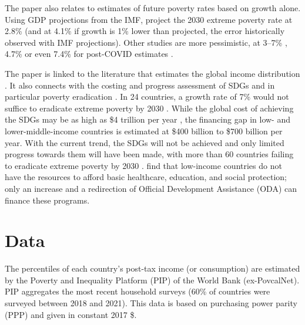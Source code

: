 \documentclass[12pt,english]{article}
\begin{document}
The paper also relates to estimates of future poverty rates based on growth alone. Using GDP projections from the IMF, \cite{karver_mdgs_2012} project the 2030 extreme poverty rate at 2.8\% (and at 4.1\% if growth is 1\% lower than projected, the error historically observed with IMF projections). Other studies are more pessimistic, at 3--7\% \citep{chandy_final_2013,bicaba_can_2017}, 4.7\% \citep{manuel_financing_2018} or even 7.4\% for post-COVID estimates \citep{lakner_how_2022}. 

The paper is linked to the literature that estimates the global income distribution \citep{pinkovskiy_parametric_2009,anand_chapter_2015,lahoti_global_2016,lakner_global_2016,gradin_trends_2021,jorda_global_2019,alvaredo_methods_2021,milanovic_three_2024}. 
It also connects with the costing and progress assessment of SDGs and in particular poverty eradication \citep{schmidt-traub_investment_2015,rozenberg_beyond_2019,sdsn_sdg_2019,manuel_financing_2020,vorisek_understanding_2020,unctad_estimating_2021,un_sustainable_2022}. In 24 countries, a growth rate of 7\% would not suffice to eradicate extreme poverty by 2030 \citep{unctad_estimating_2021}. While the global cost of achieving the SDGs may be as high as \$4 trillion per year \citep{unctad_world_2023}, %
the financing gap in low- and lower-middle-income countries is estimated at \$400 billion \citep{sdsn_sdg_2019} %
to \$700 billion \citep{kharas_building_2019} %
per year. With the current trend, the SDGs will not be achieved and only limited progress towards them will have been made, with more than 60 countries failing to eradicate extreme poverty by 2030 \citep{moyer_are_2020}. %
\cite{manuel_financing_2018} find that low-income countries do not have the resources to afford basic healthcare, education, and social protection; only an increase and a redirection of Official Development Assistance (ODA) can finance these programs. 

\section{Data}\label{subsec:data}
The percentiles of each country's post-tax income (or consumption) are estimated by the Poverty and Inequality Platform (PIP) of the World Bank (ex-PovcalNet). PIP aggregates the most recent household surveys (60\% of countries were surveyed between 2018 and 2021). This data is based on purchasing power parity (PPP) and given in constant 2017 \$. %
\end{document}
